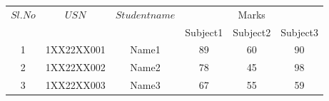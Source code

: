 \documentclass{article}
\begin{document}
 
\begin{tabular}{|c|c|c|c|c|c|}
\hline
$Sl.No$ & $USN$&  $Student name$ &\multicolumn{3}{c|}{Marks}\\ 
\cline{4-6} 
& & & Subject1 & Subject2 &Subject3 \\ \hline 
1& 1XX22XX001&Name1 &89 &60 &90 \\ \hline 
2& 1XX22XX002&Name2 &78 &45 &98 \\ \hline 
3& 1XX22XX003&Name3 &67 &55 &59 \\ \hline
\end{tabular} 
\end{document}
